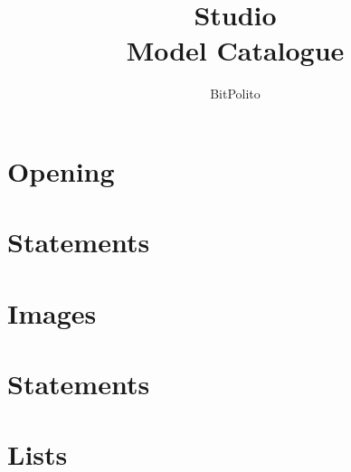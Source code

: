 \documentclass[aspectratio=169]{beamer}
\title{Studio\\Model Catalogue}
\author{BitPolito}
\institute{Editable slide templates}
\date{}
\newcommand{\studiocataloguename}{}
\begin{document}
\section{Opening}
\gdef\studiocataloguename{\detokenize{\studiotemplate[variant={pattern}]{cover}}}
\gdef\studiocataloguename{\detokenize{\studiotemplate[variant={panels}]{agenda}}}
\gdef\studiocataloguename{\detokenize{\studiotemplate[variant={default}]{section-divider}}}
\gdef\studiocataloguename{\detokenize{\studiotemplate[variant={default}]{cover-dashboard}}}
\section{Statements}
\gdef\studiocataloguename{\detokenize{\studiotemplate[variant={arrow}]{statement}}}
\gdef\studiocataloguename{\detokenize{\studiotemplate[variant={compact}]{icon-statement}}}
\gdef\studiocataloguename{\detokenize{\studiotemplate[variant={layered}]{quotation}}}
\gdef\studiocataloguename{\detokenize{\studiotemplate[variant={three-messages}]{dialogue}}}
\gdef\studiocataloguename{\detokenize{\studiotemplate[variant={plain}]{oversized-number}}}
\section{Images}
\gdef\studiocataloguename{\detokenize{\studiotemplate[variant={left}]{image-text}}}
\section{Statements}
\gdef\studiocataloguename{\detokenize{\studiotemplate[variant={left}]{paragraphs}}}
\section{Lists}
\gdef\studiocataloguename{\detokenize{\studiotemplate[variant={default}]{two-columns}}}
\gdef\studiocataloguename{\detokenize{\studiotemplate[variant={three-items}]{list-rail}}}
\gdef\studiocataloguename{\detokenize{\studiotemplate[variant={default}]{labelled-rows}}}
\gdef\studiocataloguename{\detokenize{\studiotemplate[variant={default}]{levels}}}
\gdef\studiocataloguename{\detokenize{\studiotemplate[variant={default}]{title-two-column-list}}}
\gdef\studiocataloguename{\detokenize{\studiotemplate[variant={default}]{partner-rail}}}
\end{document}
